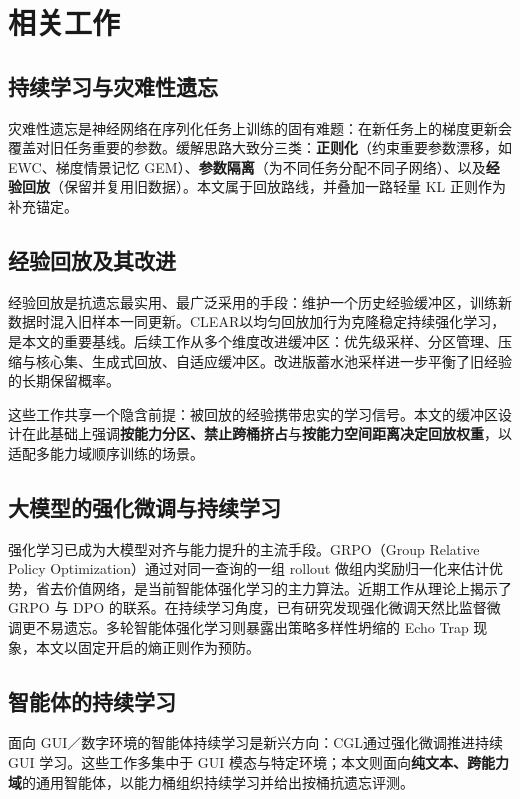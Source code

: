 \chapter{相关工作}
\label{chap:related}

\section{持续学习与灾难性遗忘}

灾难性遗忘是神经网络在序列化任务上训练的固有难题：在新任务上的梯度更新会覆盖对旧任务重要的参数。缓解思路大致分三类：\textbf{正则化}（约束重要参数漂移，如 EWC、梯度情景记忆 GEM）、\textbf{参数隔离}（为不同任务分配不同子网络）、以及\textbf{经验回放}（保留并复用旧数据）。本文属于回放路线，并叠加一路轻量 KL 正则作为补充锚定。

\section{经验回放及其改进}

经验回放是抗遗忘最实用、最广泛采用的手段：维护一个历史经验缓冲区，训练新数据时混入旧样本一同更新。CLEAR以均匀回放加行为克隆稳定持续强化学习，是本文的重要基线。后续工作从多个维度改进缓冲区：优先级采样、分区管理、压缩与核心集、生成式回放、自适应缓冲区。改进版蓄水池采样进一步平衡了旧经验的长期保留概率。

这些工作共享一个隐含前提：被回放的经验携带忠实的学习信号。本文的缓冲区设计在此基础上强调\textbf{按能力分区、禁止跨桶挤占}与\textbf{按能力空间距离决定回放权重}，以适配多能力域顺序训练的场景。

\section{大模型的强化微调与持续学习}

强化学习已成为大模型对齐与能力提升的主流手段。GRPO（Group Relative Policy Optimization）通过对同一查询的一组 rollout 做组内奖励归一化来估计优势，省去价值网络，是当前智能体强化学习的主力算法。近期工作从理论上揭示了 GRPO 与 DPO 的联系。在持续学习角度，已有研究发现强化微调天然比监督微调更不易遗忘。多轮智能体强化学习则暴露出策略多样性坍缩的 Echo Trap 现象，本文以固定开启的熵正则作为预防。

\section{智能体的持续学习}

面向 GUI／数字环境的智能体持续学习是新兴方向：CGL通过强化微调推进持续 GUI 学习。这些工作多集中于 GUI 模态与特定环境；本文则面向\textbf{纯文本、跨能力域}的通用智能体，以能力桶组织持续学习并给出按桶抗遗忘评测。
